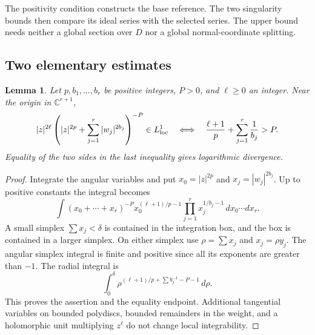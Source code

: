 \documentclass[11pt]{article}
\newtheorem{lemma}{Lemma}
\begin{document}
The positivity condition constructs the base reference. The two singularity
bounds then compare its ideal series with the selected series. The upper
bound needs neither a global section over $D$ nor a global normal-coordinate
splitting.

\subsection{Two elementary estimates}
\begin{lemma}\label{lem:integral}
Let $p,b_1,\ldots,b_r$ be positive integers, $P>0$, and $\ell\geq0$ an
integer. Near the origin in $\mathbb C^{r+1}$,
\[
 |z|^{2\ell}\left(|z|^{2p}+\sum_{j=1}^r|w_j|^{2b_j}\right)^{-P}
 \in L^1_{\rm loc}
 \quad\Longleftrightarrow\quad
 \frac{\ell+1}{p}+\sum_{j=1}^r\frac1{b_j}>P.
\]
Equality of the two sides in the last inequality gives logarithmic divergence.
\end{lemma}
\begin{proof}
Integrate the angular variables and put
$x_0=|z|^{2p}$ and $x_j=|w_j|^{2b_j}$. Up to positive constants the integral
becomes
\[
 \int (x_0+\cdots+x_r)^{-P}
 x_0^{(\ell+1)/p-1}\prod_{j=1}^r x_j^{1/b_j-1}\,dx_0\cdots dx_r.
\]
A small simplex $\sum x_j<\delta$ is contained in the integration box, and
the box is contained in a larger simplex. On either simplex use
$\rho=\sum x_j$ and $x_j=\rho y_j$. The angular simplex integral is finite
and positive since all its exponents are greater than $-1$. The radial
integral is
\[
 \int_0^\delta\rho^{(\ell+1)/p+\sum b_j^{-1}-P-1}\,d\rho.
\]
This proves the assertion and the equality endpoint. Additional tangential
variables on bounded polydiscs, bounded remainders in the weight, and a
holomorphic unit multiplying $z^\ell$ do not change local integrability.
\end{proof}
\end{document}
